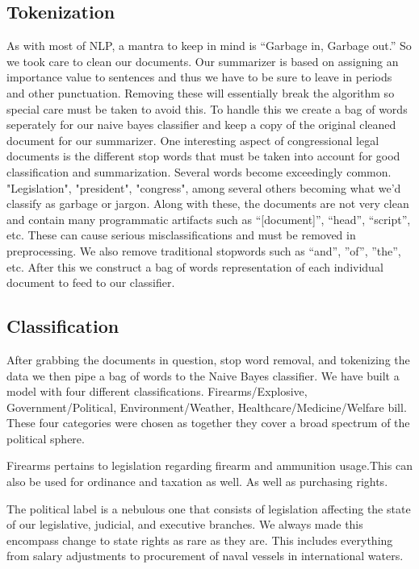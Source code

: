 \documentclass[11pt,a4paper]{article}
\begin{document}
\subsection{Tokenization}
As with most of NLP, a mantra to keep in mind is “Garbage in, Garbage out.” So we took care to clean our documents. Our summarizer is based on assigning an importance value to sentences and thus we have to be sure to leave in periods and other punctuation. Removing these will essentially break the algorithm so special care must be taken to avoid this. To handle this we create a bag of words seperately for our naive bayes classifier and keep a copy of the original cleaned document for our summarizer. 
\newline\indent   One interesting aspect of congressional legal documents is the different stop words that must be taken into account for good classification and summarization. Several words become exceedingly common. "Legislation", "president", "congress", among several others becoming what we'd classify as garbage or jargon. Along with these, the documents are not very clean and contain many programmatic artifacts such as “[document]”, “head”, “script”, etc. These can cause serious misclassifications and must be removed in preprocessing. We also remove traditional stopwords such as “and”, ”of”, ”the”, etc. After this we construct a bag of words representation of each individual 
document to feed to our classifier. 

\subsection{Classification}
After grabbing the documents in question, stop word removal, and tokenizing the data we then pipe a bag of words to the Naive Bayes classifier.  We have built a model with four different classifications. Firearms/Explosive, Government/Political, Environment/Weather, Healthcare/Medicine/Welfare bill. These four categories were chosen as together they cover a broad spectrum of the political sphere. 

Firearms pertains to legislation regarding firearm and ammunition usage.This can also be used for ordinance and taxation as well. As well as  purchasing rights. 

The political label is a nebulous one that consists of legislation affecting the state of our legislative, judicial, and executive branches. We always made this encompass change to state rights as rare as they are. This includes everything from salary adjustments to procurement of naval vessels in international waters. 
\end{document}
